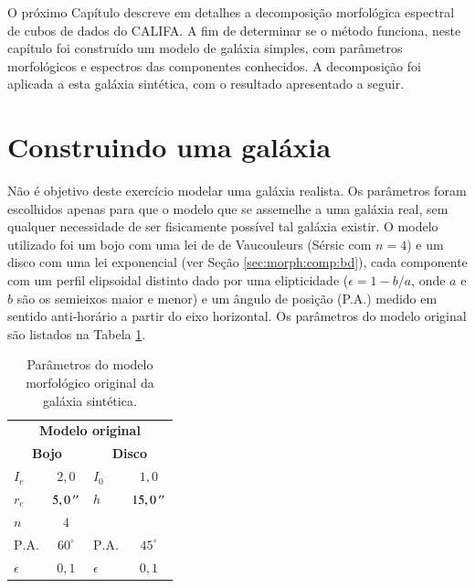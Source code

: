 O próximo Capítulo descreve em detalhes a decomposição morfológica espectral de
cubos de dados do CALIFA. A fim de determinar se o método funciona, neste
capítulo foi construído um modelo de galáxia simples, com parâmetros
morfológicos e espectros das componentes conhecidos. A decomposição foi aplicada
a esta galáxia sintética, com o resultado apresentado a seguir.

\section{Construindo uma galáxia}

Não é objetivo deste exercício modelar uma galáxia realista. Os parâmetros foram
escolhidos apenas para que o modelo que se assemelhe a uma galáxia real, sem
qualquer necessidade de ser fisicamente possível tal galáxia existir. O modelo
utilizado foi um bojo com uma lei de de Vaucouleurs (Sérsic com $n=4$) e um
disco com uma lei exponencial (ver Seção \ref{sec:morph:comp:bd}), cada
componente com um perfil elipsoidal distinto dado por uma elipticidade
($\epsilon = 1 - b/a$, onde $a$ e $b$ são os semieixos maior e menor) e um
ângulo de posição (P.A.) medido em sentido anti-horário a partir do eixo
horizontal. Os parâmetros do modelo original são listados na Tabela
\ref{tab:testeModeloOriginal}.

\begin{table}
\begin{tabular}{ l  c | l  c }
  \hline
  \multicolumn{4}{c}{\textbf{Modelo original}} \\
  \multicolumn{2}{c}{\textbf{Bojo}} & \multicolumn{2}{c}{\textbf{Disco}} \\
  \hline
  $I_e$ & $2,0$ & $I_0$ & $1,0$ \\
  $r_e$ & $5,0\,^{\prime\prime}$ & $h$ & $15,0\,^{\prime\prime}$ \\
  $n$ & $4$ & & \\
  $\mathrm{P.A.}$ & $60^\circ$ & $\mathrm{P.A.}$ & $45^\circ$ \\
  $\epsilon$ & $0,1$ & $\epsilon$ & $0,1$ \\
  \hline
\end{tabular}
\caption[Modelo morfológico original da galáxia sintética]
{Parâmetros do modelo morfológico original da galáxia sintética.}
\label{tab:testeModeloOriginal}
\end{table}

